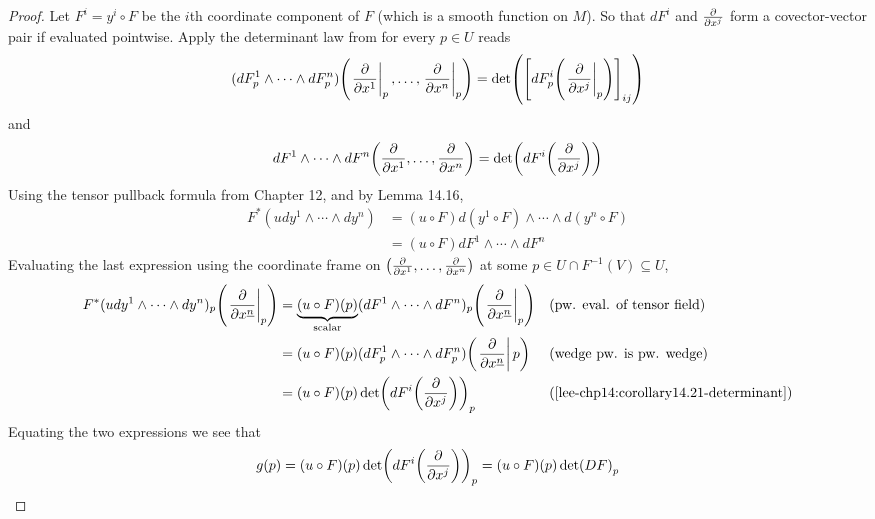 \documentclass[../main-manifolds.tex]{subfiles}
\begin{document}
\begin{proof}
        Let $F^i = y^i\circ F$ be the $i$th coordinate component of $F$ (which is a smooth function on $M$). So that $dF^i$ and $\pdv{x^j}$ form a covector-vector pair if evaluated pointwise. Apply the determinant law from  for every $p\in U$ reads
        \begin{equation}\label{lee-chp14:corollary14.21-determinant}
            (dF^1_p\wedge\cdots\wedge dF^n_p)\qty(\eval{\pdv{x^1}}_{p},\ldots,\eval{\pdv{x^n}}_{p}) = \det(\qty[dF^i_p\qty(\eval{\pdv{x^j}}_p)]_{ij})
        \end{equation}
        and
        \[
            dF^1\wedge\cdots\wedge dF^n\qty(\pdv{x^1},\ldots,\pdv{x^n}) = \det(dF^i\qty(\pdv{x^j}))
        \]
        Using the tensor pullback formula from Chapter 12, and by Lemma 14.16, 
        \begin{align*}
            F^*(udy^1\wedge\cdots\wedge dy^n) &= (u\circ F)d(y^1\circ F)\wedge\cdots\wedge d(y^n\circ F)\\
            &= (u\circ F)dF^1\wedge\cdots\wedge dF^n
        \end{align*}
        Evaluating the last expression using the coordinate frame on   $\qty(\pdv{x^1},\ldots,\pdv{x^n})$ at some $p\in U\cap F^{-1}(V)\subseteq U$,
        \begin{align*}
            F^*(udy^1\wedge\cdots\wedge dy^n)_p\qty(\eval{\pdv{x^{\underline{n}}}}_p) &= \underbrace{(u\circ F)(p)}_{\text{scalar}}(dF^1\wedge\cdots\wedge dF^n)_p\qty(\eval{\pdv{x^{\underline{n}}}}_{p}) && \text{(pw. eval. of tensor field)}\\
            &= (u\circ F)(p)(dF^1_p\wedge\cdots\wedge dF^n_p)\qty(\eval{\pdv{x^{\underline{n}}}}p) && \text{(wedge pw. is pw. wedge)}\\
            &= (u\circ F)(p)\det(dF^{i}\qty(\pdv{x^j}))_p && \text{(\Cref{lee-chp14:corollary14.21-determinant})}
        \end{align*}
        Equating the two expressions we see that
        \[
            g(p) = (u\circ F)(p)\det(dF^{i}\qty(\pdv{x^j}))_p = (u\circ F)(p)\det(DF)_p
        \]
    \end{proof}
\end{document}
